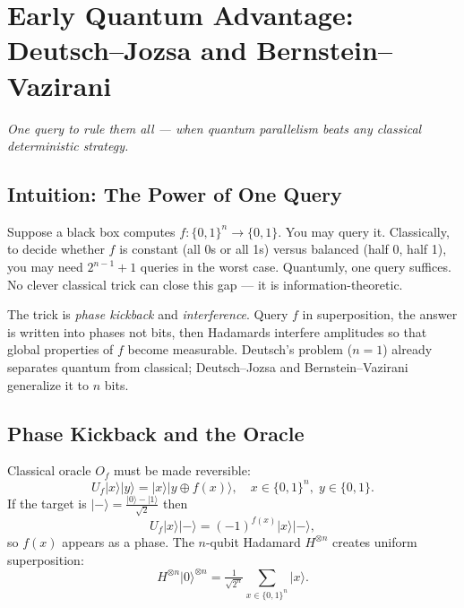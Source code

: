 \chapter{Early Quantum Advantage: Deutsch--Jozsa and Bernstein--Vazirani}\label{ch:deutsch}
\begin{center}\small\textit{One query to rule them all --- when quantum parallelism beats any classical deterministic strategy.}\end{center}

\section{Intuition: The Power of One Query}
Suppose a black box computes $f:\{0,1\}^n\to\{0,1\}$. You may query it. Classically, to decide whether $f$ is constant (all 0s or all 1s) versus balanced (half 0, half 1), you may need $2^{n-1}+1$ queries in the worst case. Quantumly, one query suffices. No clever classical trick can close this gap --- it is information-theoretic.

The trick is \emph{phase kickback} and \emph{interference}. Query $f$ in superposition, the answer is written into phases not bits, then Hadamards interfere amplitudes so that global properties of $f$ become measurable. Deutsch's problem ($n=1$) already separates quantum from classical; Deutsch--Jozsa and Bernstein--Vazirani generalize it to $n$ bits.

\section{Phase Kickback and the Oracle}
Classical oracle $O_f$ must be made reversible:
\begin{equation}
U_f\lvert x\rangle\lvert y\rangle=\lvert x\rangle\lvert y\oplus f(x)\rangle,\quad x\in\{0,1\}^n,\;y\in\{0,1\}.
\end{equation}
If the target is $\lvert-\rangle=\tfrac{\lvert0\rangle-\lvert1\rangle}{\sqrt2}$ then
\begin{equation}
U_f\lvert x\rangle\lvert-\rangle = (-1)^{f(x)}\lvert x\rangle\lvert-\rangle,
\end{equation}
so $f(x)$ appears as a phase. The $n$-qubit Hadamard $H^{\otimes n}$ creates uniform superposition:
\begin{equation}
H^{\otimes n}\lvert0\rangle^{\otimes n}=\tfrac1{\sqrt{2^n}}\sum_{x\in\{0,1\}^n}\lvert x\rangle .
\end{equation}

